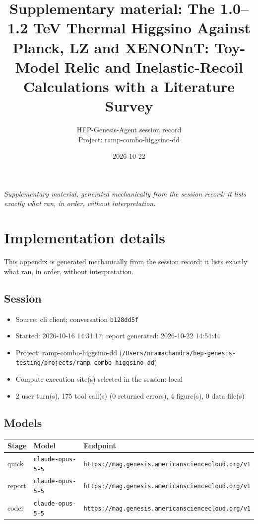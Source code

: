 \documentclass[11pt,a4paper]{article}
\title{Supplementary material: The 1.0--1.2 TeV Thermal Higgsino Against Planck, LZ and XENONnT: Toy-Model Relic and Inelastic-Recoil Calculations with a Literature Survey}
\author{HEP-Genesis-Agent session record \\ \small Project: ramp-combo-higgsino-dd}
\date{2026-10-22}
\begin{document}
\maketitle
\noindent\textit{\small Supplementary material, generated mechanically from the session record: it lists exactly what ran, in order, without interpretation.}
\vspace{1em}



\appendix
\section{Implementation details}
\label{app:impl}
This appendix is generated mechanically from the session record; it lists exactly what ran, in order, without interpretation.
\subsection{Session}
\begin{itemize}
  \item Source: cli client; conversation \texttt{b128dd5f}
  \item Started: 2026-10-16 14:31:17; report generated: 2026-10-22 14:54:44
  \item Project: ramp-combo-higgsino-dd (\texttt{/\allowbreak{}Users/\allowbreak{}nramachandra/\allowbreak{}hep-genesis-testing/\allowbreak{}projects/\allowbreak{}ramp-combo-higgsino-dd})
  \item Compute execution site(s) selected in the session: local
  \item 2 user turn(s), 175 tool call(s) (0 returned errors), 4 figure(s), 0 data file(s)
\end{itemize}
\subsection{Models}
\begin{longtable}{@{}p{}p{}p{}@{}}
\toprule Stage & Model & Endpoint \\ \midrule \endhead
quick & \texttt{claude-opus-5-5} & \texttt{https:\allowbreak{}/\allowbreak{}/\allowbreak{}mag.genesis.americansciencecloud.org/\allowbreak{}v1} \\
report & \texttt{claude-opus-5-5} & \texttt{https:\allowbreak{}/\allowbreak{}/\allowbreak{}mag.genesis.americansciencecloud.org/\allowbreak{}v1} \\
coder & \texttt{claude-opus-5-5} & \texttt{https:\allowbreak{}/\allowbreak{}/\allowbreak{}mag.genesis.americansciencecloud.org/\allowbreak{}v1} \\
\bottomrule\end{longtable}
\end{document}
